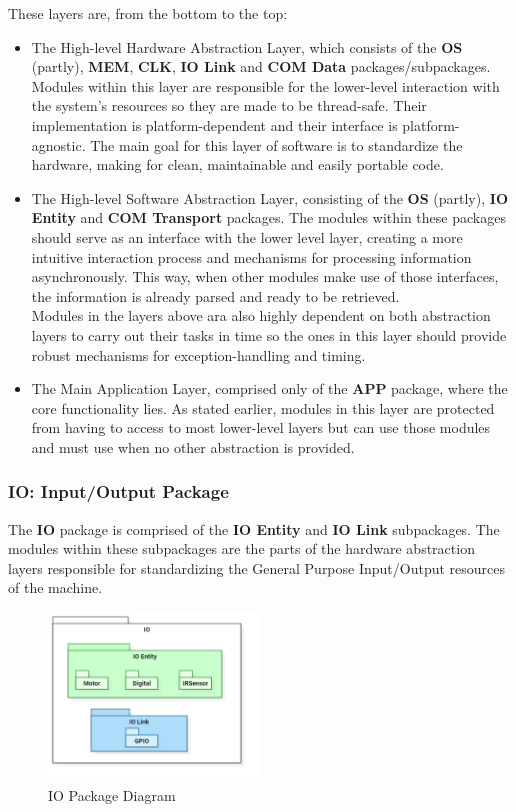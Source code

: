 These layers are, from the bottom to the top:
\begin{itemize}
	\item The High-level Hardware Abstraction Layer, which consists of the \textbf{OS} (partly), \textbf{MEM}, \textbf{CLK}, \textbf{IO Link} and \textbf{COM Data} packages/subpackages. Modules within this layer are responsible for the lower-level interaction with the system's resources so they are made to be thread-safe. Their implementation is platform-dependent and their interface is platform-agnostic. The main goal for this layer of software is to standardize the hardware, making for clean, maintainable and easily portable code. 
	\item The High-level Software Abstraction Layer, consisting of the \textbf{OS} (partly), \textbf{IO Entity} and \textbf{COM Transport} packages. The modules within these packages should serve as an interface with the lower level layer, creating a more intuitive interaction process and mechanisms for processing information asynchronously. This way, when other modules make use of those interfaces, the information is already parsed and ready to be retrieved.\\
	Modules in the layers above ara also highly dependent on both abstraction layers to carry out their tasks in time so the ones in this layer should provide robust mechanisms for exception-handling and timing. 
	\item The Main Application Layer, comprised only of the \textbf{APP} package, where the core functionality lies. As stated earlier, modules in this layer are protected from having to access to most lower-level layers but can use those modules and must use when no other abstraction is provided.
\end{itemize}




\subsubsection{IO: Input/Output Package}

The \textbf{IO} package is comprised of the \textbf{IO Entity} and \textbf{IO Link} subpackages. The modules within these subpackages are the parts of the hardware abstraction layers responsible for standardizing the General Purpose Input/Output resources of the machine.

\begin{figure}[H]
	\centering
	\includegraphics[width=0.5\textwidth]{./img/package-diagram-io.png}
	\caption {IO Package Diagram}
	\label{fig:navig-package-diagram-io}
	\end{figure}


